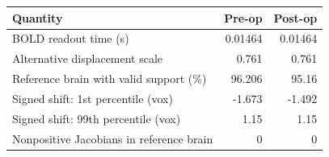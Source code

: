 \begin{tabular}{lrr}
\toprule
Quantity & Pre-op & Post-op \\
\midrule
BOLD readout time (s) & 0.01464 & 0.01464 \\
Alternative displacement scale & 0.761 & 0.761 \\
Reference brain with valid support (\%) & 96.206 & 95.16 \\
Signed shift: 1st percentile (vox) & -1.673 & -1.492 \\
Signed shift: 99th percentile (vox) & 1.15 & 1.15 \\
Nonpositive Jacobians in reference brain & 0 & 0 \\
\bottomrule
\end{tabular}

